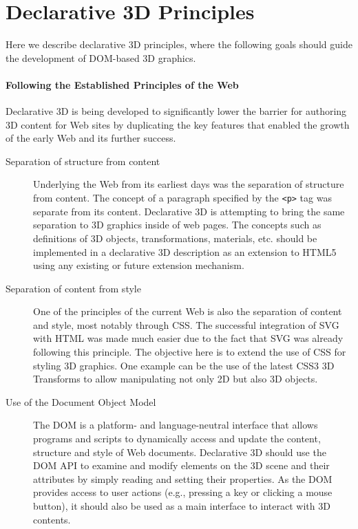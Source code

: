 \documentclass[review]{acmsiggraph}
\begin{document}
\section{Declarative 3D Principles}
\label{sec:Principles}

Here we describe declarative 3D principles, where the following goals should guide the development of DOM-based 3D graphics.

\paragraph{Following the Established Principles of the Web}
Declarative 3D is being developed to significantly lower the barrier for authoring 3D content for Web sites by duplicating the key features that enabled the growth of the early Web and its further success.

\begin{description}
  \item [Separation of structure from content] Underlying the Web from its earliest days was the separation of structure from content. The concept of a paragraph specified by the \verb|<p>| tag was separate from its content. Declarative 3D is attempting to bring the same separation to 3D graphics inside of web pages. The concepts such as definitions of 3D objects, transformations, materials, etc. should be implemented in a declarative 3D description as an extension to HTML5 \cite{HTML5} using any existing or future extension mechanism.
  \item [Separation of content from style] One of the principles of the current Web is also the separation of content and style, most notably through CSS. The successful integration of SVG \cite{svg} with HTML was made much easier due to the fact that SVG was already following this principle. The objective here is to extend the use of CSS for styling 3D graphics. One example can be the use of the latest CSS3 3D Transforms \cite{webkit3DCSS} to allow manipulating not only 2D but also 3D objects.
  \item [Use of the Document Object Model] The DOM \cite{W3C-DOM} is a platform- and language-neutral interface that allows programs and scripts to dynamically access and update the content, structure and style of Web documents. Declarative 3D should use the DOM API to examine and modify elements on the 3D scene and their attributes by simply reading and setting their properties. As the DOM provides access to user actions (e.g., pressing a key or clicking a mouse button), it should also be used as a main interface to interact with 3D contents.
\end{description}
\end{document}
